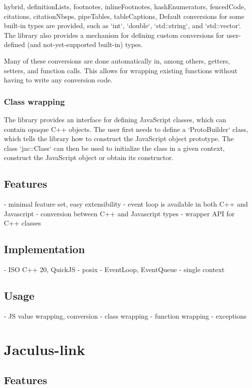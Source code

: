 \documentclass[
  digital,
  oneside,
  nosansbold,
  nocolorbold,
  lof,
  lot
]{fithesis4}
\begin{document}
\begin{markdown*}{%
  hybrid,
  definitionLists,
  footnotes,
  inlineFootnotes,
  hashEnumerators,
  fencedCode,
  citations,
  citationNbsps,
  pipeTables,
  tableCaptions,
}
Default conversions for some built-in types are provided, such as `int`, `double`, `std::string`, and `std::vector`. The library also provides a mechanism for defining custom conversions for user-defined (and not-yet-supported built-in) types.

Many of these conversions are done automatically in, among others, getters, setters, and function calls. This allows for wrapping existing functions without having to write any conversion code.

\subsection{Class wrapping}

The library provides an interface for defining JavaScript classes, which can contain opaque C++ objects. The user first needs to define a `ProtoBuilder` class, which tells the library how to construct the JavaScript object prototype. The class `jac::Class` can then be used to initialize the class in a given context, construct the JavaScript object or obtain its constructor.


\section{Features}

  - minimal feature set, easy extensibility
  - event loop is available in both C++ and Javascript
  - conversion between C++ and Javascript types
  - wrapper API for C++ classes

\section{Implementation}

  - ISO C++ 20, QuickJS - posix
  - EventLoop, EventQueue
  - single context

\section{Usage}

  - JS value wrapping, conversion
  - class wrapping
  - function wrapping
  - exceptions

\chapter{Jaculus-link}

\section{Features}


\end{markdown*}
\end{document}

